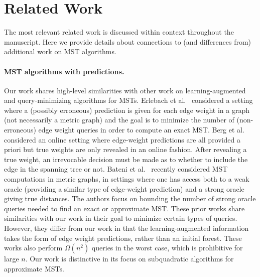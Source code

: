 \section{Related Work}
\label{sec:related}
The most relevant related work is discussed within context throughout the manuscript. Here we provide details about connections to (and differences from) additional work on MST algorithms. 

\paragraph{MST algorithms with predictions.}
Our work shares high-level similarities with other work on learning-augmented and query-minimizing algorithms for MSTs. Erlebach et al.~\cite{erlebach2022learning} considered a setting where a (possibly erroneous) prediction is given for each edge weight in a graph (not necessarily a metric graph) and the goal is to minimize the number of (non-erroneous) edge weight queries in order to compute an exact MST. 
Berg et al.~\cite{berg2023online} considered an online setting where edge-weight predictions are all provided a priori but true weights are only revealed in an online fashion. After revealing a true weight, an irrevocable decision must be made as to whether to include the edge in the spanning tree or not. 
Bateni et al.~\cite{bateni2024metric} recently considered MST computations in metric graphs, in settings where one has access both to a weak oracle (providing a similar type of edge-weight prediction) and a strong oracle giving true distances. The authors focus on bounding the number of strong oracle queries needed to find an exact or approximate MST. These prior works share similarities with our work in their goal to minimize certain types of queries. However, they differ from our work in that the learning-augmented information takes the form of edge weight predictions, rather than an initial forest. These works also perform $\Omega(n^2)$ queries in the worst case, which is prohibitive for large $n$.
Our work is distinctive in its focus on subquadratic algorithms for approximate MSTs.

